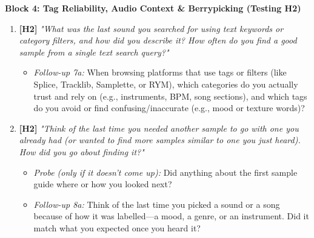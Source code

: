\vspace{0.3em}
\noindent\textbf{Block 4: Tag Reliability, Audio Context \& Berrypicking (Testing H2)}
\begin{enumerate}[resume, leftmargin=*, nosep]
    \item \textbf{[H2]} \textit{"What was the last sound you searched for using text keywords or category filters, and how did you describe it? How often do you find a good sample from a single text search query?"}
    \begin{itemize}[leftmargin=1.5cm, nosep]
        \item \textit{Follow-up 7a:} When browsing platforms that use tags or filters (like Splice, Tracklib, Samplette, or RYM), which categories do you actually trust and rely on (e.g., instruments, BPM, song sections), and which tags do you avoid or find confusing/inaccurate (e.g., mood or texture words)?
    \end{itemize}
    \item \textbf{[H2]} \textit{"Think of the last time you needed another sample to go with one you already had (or wanted to find more samples similar to one you just heard). How did you go about finding it?"}
    \begin{itemize}[leftmargin=1.5cm, nosep]
        \item \textit{Probe (only if it doesn't come up):} Did anything about the first sample guide where or how you looked next?
        \item \textit{Follow-up 8a:} Think of the last time you picked a sound or a song because of how it was labelled---a mood, a genre, or an instrument. Did it match what you expected once you heard it?
    \end{itemize}
\end{enumerate}

